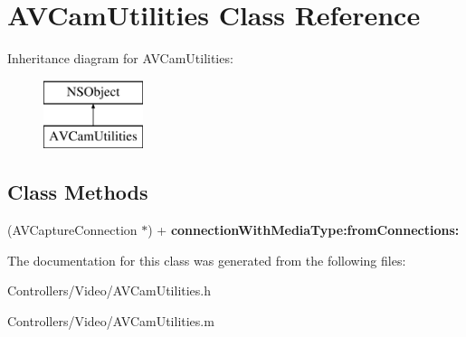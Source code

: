 \hypertarget{interface_a_v_cam_utilities}{}\section{A\+V\+Cam\+Utilities Class Reference}
\label{interface_a_v_cam_utilities}
Inheritance diagram for A\+V\+Cam\+Utilities\+:\begin{figure}[H]
\begin{center}
\leavevmode
\includegraphics[height=2.000000cm]{interface_a_v_cam_utilities}
\end{center}
\end{figure}
\subsection*{Class Methods}
\begin{DoxyCompactItemize}
\item 
\hypertarget{interface_a_v_cam_utilities_aed2e14b14113b9e45f42af822c74c3a4}{}(A\+V\+Capture\+Connection $\ast$) + {\bfseries connection\+With\+Media\+Type\+:from\+Connections\+:}\label{interface_a_v_cam_utilities_aed2e14b14113b9e45f42af822c74c3a4}

\end{DoxyCompactItemize}


The documentation for this class was generated from the following files\+:\begin{DoxyCompactItemize}
\item 
Controllers/\+Video/A\+V\+Cam\+Utilities.\+h\item 
Controllers/\+Video/A\+V\+Cam\+Utilities.\+m\end{DoxyCompactItemize}
